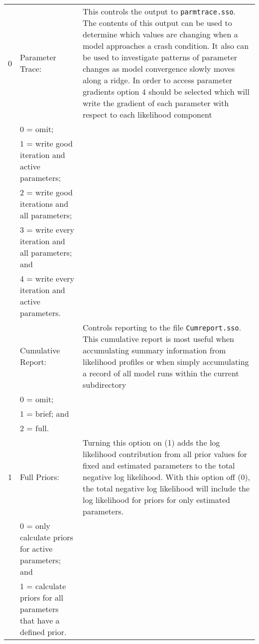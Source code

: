 {\begin{landscape}
\begin{longtable}{p{1.5cm} p{7.2cm} p{12.3cm}}
 \hline
 0 & Parameter Trace: & \multirow{1}{1cm}[-0.25cm]{\parbox{12.5cm}{This controls the output to \texttt{parmtrace.sso}. The contents of this output can be used to determine which values are changing when a model approaches a crash condition. It also can be used to investigate patterns of parameter changes as model convergence slowly moves along a ridge. In order to access parameter gradients option 4 should be selected which will write the gradient of each parameter with respect to each likelihood component}} \Tstrut\\
   & 0 = omit; & \\
   & 1 = write good iteration and active parameters; & \\
   & 2 = write good iterations and all parameters; & \\
   & 3 = write every iteration and all parameters; and & \\
   & 4 = write every iteration and active parameters. & \Bstrut\\
 \hline
 
 \pagebreak
 1 & Cumulative Report: & \multirow{1}{1cm}[-0.25cm]{\parbox{12.5cm}{Controls reporting to the file \texttt{Cumreport.sso}. This cumulative report is most useful when accumulating summary information from likelihood profiles or when simply accumulating a record of all model runs within the current subdirectory}} \Tstrut\\
   & 0 = omit;  & \\
   & 1 = brief; and & \\
   & 2 = full. & \\
	 
 \hline
 1 & Full Priors: & \multirow{1}{1cm}[-0.25cm]{\parbox{12.5cm}{Turning this option on (1) adds the log likelihood contribution from all prior values for fixed and estimated parameters to the total negative log likelihood. With this option off (0), the total negative log likelihood will include the log likelihood for priors for only estimated parameters.}} \Tstrut\\
   & 0 = only calculate priors for active parameters; and &	\\
   & 1 = calculate priors for all parameters that have a defined prior. & \\
	     

\end{longtable}
\end{landscape}}
